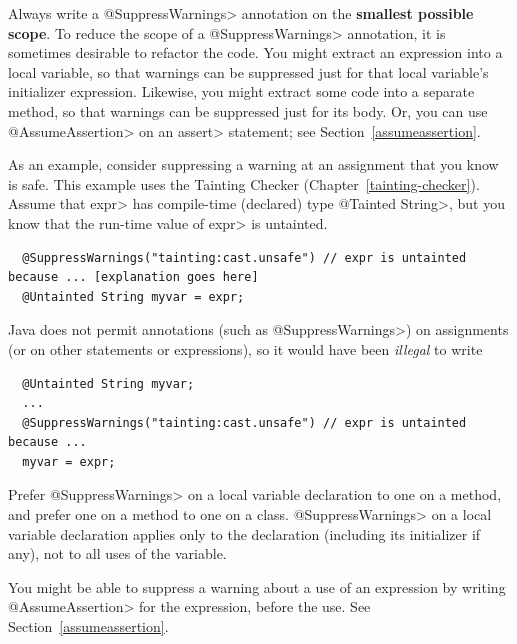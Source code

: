 Always write a \<@SuppressWarnings> annotation on the \textbf{smallest possible
scope}.  To reduce the scope of a \<@SuppressWarnings> annotation, it is
sometimes desirable to refactor the code.  You might extract an expression
into a local variable, so that warnings can be suppressed just for that
local variable's initializer expression.  Likewise, you might extract some
code into a separate method, so that warnings can be suppressed just for
its body.  Or, you can use \<@AssumeAssertion> on an \<assert> statement;
see Section~\ref{assumeassertion}.

As an example, consider suppressing a warning at an assignment that you know is
safe.  This example uses the Tainting Checker
(Chapter~\ref{tainting-checker}).  Assume that \<expr> has compile-time
(declared) type \<@Tainted String>, but you know that the run-time value of
\<expr> is untainted.

\begin{smaller}
\begin{Verbatim}
  @SuppressWarnings("tainting:cast.unsafe") // expr is untainted because ... [explanation goes here]
  @Untainted String myvar = expr;
\end{Verbatim}
\end{smaller}

\noindent
Java does not permit annotations (such as \<@SuppressWarnings>) on
assignments (or on other statements or expressions), so
it would have been \emph{illegal} to write

\begin{smaller}
\begin{Verbatim}
  @Untainted String myvar;
  ...
  @SuppressWarnings("tainting:cast.unsafe") // expr is untainted because ...
  myvar = expr;
\end{Verbatim}
\end{smaller}




Prefer \<@SuppressWarnings> on a local variable declaration to one on a method, and
prefer one on a method to one on a class.
\<@SuppressWarnings> on a local variable declaration applies only to the
declaration (including its initializer if any), not to all uses of the variable.

You might be able to suppress a warning about a use of an expression by
writing \<@AssumeAssertion> for the expression, before the use.  See
Section~\ref{assumeassertion}.

